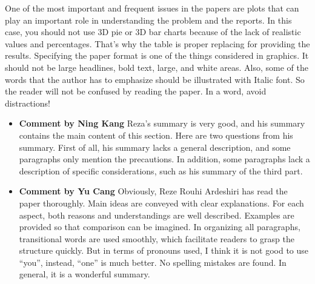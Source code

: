 \documentclass[paper=a4, fontsize=11pt]{scrartcl} %
\numberwithin{equation}{section} %
\numberwithin{figure}{section} %
\numberwithin{table}{section} %
\begin{document}
		One of the most important and frequent issues in the papers are plots that can play an important role in understanding the problem and the reports. In this case, you should not use 3D pie or 3D bar charts because of the lack of realistic values and percentages. That’s why the table is proper replacing for providing the results.\newline
		Specifying the paper format is one of the things considered in graphics. It should not be large headlines, bold text, large, and white areas. Also, some of the words that the author has to emphasize should be illustrated with Italic font. So the reader will not be confused by reading the paper. In a word, avoid distractions!
		
		\begin{itemize}
			\item \textbf{Comment by Ning Kang} \newline
				Reza's summary is very good, and his summary contains the main content of this section. Here are two questions from his summary. First of all, his summary lacks a general description, and some paragraphs only mention the precautions. In addition, some paragraphs lack a description of specific considerations, such as his summary of the third part.
			
			\item \textbf{Comment by Yu Cang} \newline
				Obviously, Reze Rouhi Ardeshiri has read the paper thoroughly. Main ideas are conveyed with clear explanations. For each aspect, both reasons and understandings are well described. Examples are provided so that comparison can be imagined. In organizing all paragraphs, transitional words are used smoothly, which facilitate readers to grasp the structure quickly. But in terms of pronouns used, I think it is not good to use “you”, instead, “one” is much better. No spelling mistakes are found. In general, it is a wonderful summary.
			
		\end{itemize}
	
\end{document}
